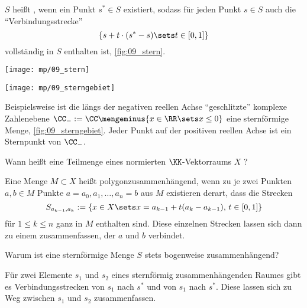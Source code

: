 \begin{antwort}
  $S$ heißt  , wenn ein Punkt 
  $s^*\in S$ existiert, sodass für jeden Punkt $s\in S$ auch die 
  "`Verbindungsstrecke"'
  \[
  \{ s+t\cdot( s^*-s ) \sets t\in [0,1] \}
  \]
  vollständig in $S$ enthalten ist, \sieheAbbildung\ref{fig:09_stern}.

  \begin{center}
    \texttt{[image: mp/09\_stern]}
    \label{fig:09_stern}
  \end{center}

  \begin{center}
    \texttt{[image: mp/09\_sterngebiet]}
    \label{fig:09_sterngebiet}
  \end{center}

  Beispielsweise ist die längs der negativen reellen Achse 
  "`geschlitzte"' komplexe Zahlenebene 
  $\CC_-:= \CC \mengeminus \{x\in\RR\sets x\le 0\}$ eine sternförmige Menge, 
  \sieheAbbildung\ref{fig:09_sterngebiet}.  
  Jeder Punkt auf der positiven reellen Achse ist ein Sternpunkt von $\CC_-$. 
  \AntEnd
\end{antwort}


\begin{frage}
  Wann heißt eine Teilmenge eines normierten $\KK$-Vektorraums $X$ 
  ?
\end{frage}


\begin{antwort}
  Eine Menge $M\subset X$ heißt polygonzusammenhängend, wenn zu je zwei 
  Punkten $a, b\in M$ Punkte $a=a_0, a_1, \ldots, a_n=b$ aus $M$ 
  existieren derart, dass die Strecken 
  \[
  S_{a_{k-1}, a_k} := \{ 
  x\in X \sets x = a_{k-1}+t(a_k - a_{k-1}), \, t\in [0,1] \}
  \]
  für $1\le k \le n$ ganz in $M$ enthalten sind. Diese einzelnen 
  Strecken lassen sich dann zu einem  zusammenfassen, 
  der $a$ und $b$ verbindet.  
  \AntEnd
\end{antwort}

\begin{frage}
  Warum ist eine sternförmige Menge $S$ stets bogenweise zusammenhängend?
\end{frage}

\begin{antwort}
  Für zwei Elemente $s_1$ und $s_2$ eines sternförmig zusammenhängenden 
  Raumes gibt es Verbindungsstrecken von $s_1$ nach $s^*$ und 
  von $s_1$ nach $s^*$. 
  Diese lassen sich zu Weg zwischen $s_1$ und $s_2$ zusammenfassen.
  \AntEnd
\end{antwort}

